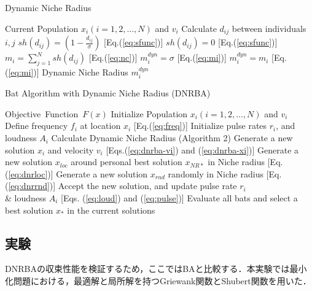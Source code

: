 \documentclass[a4j,11pt]{jarticle}
\begin{document}
\begin{algorithm}[h]
\caption{Dynamic Niche Radius}
\label{code:dnr}
\begin{algorithmic}[2]
\REQUIRE Current Population $x_i(i=1,2,..., N)$ and $v_i$
\STATE Calculate $d_{ij}$ between individuals $i,j$
\STATE $sh(d_{ij}) =  (1-\frac{d_{ij}}{\sigma})$ [Eq.(\ref{eq:sfunc})]
\ELSE
\STATE $sh(d_{ij}) =  0 $ [Eq.(\ref{eq:sfunc})]
\ENDIF
\ENDFOR
\STATE $m_i=\sum_{j=1}^N sh(d_{ij})$ [Eq.(\ref{eq:nc})]
\ENDFOR
{}
\STATE $m_i^{dyn}=\sigma$ [Eq.(\ref{eq:mi})]
\ELSE 
\STATE $m_i^{dyn} = m_i$ [Eq.(\ref{eq:mi})]
\ENDIF
\ENDFOR
\RETURN Dynamic Niche Radius $m_i^{dyn}$
\end{algorithmic}
\end{algorithm}

\begin{algorithm}[h]
\caption{Bat Algorithm with Dynamic Niche Radius (DNRBA)}
\label{code:dnrba}
\begin{algorithmic}[3]
\REQUIRE Objective\ Function\ $F(x)$
\STATE Initialize Population $x_i(i=1,2,..., N)$ and $v_i$\\
\STATE Define frequency $f_i$ at location $x_i$ [Eq.(\ref{eq:freq})]
\STATE Initialize pulse rates $r_i$, and loudness $A_i$
\STATE Calculate Dynamic Niche Radius (Algorithm 2)
\STATE Generate a new solution $x_i$ and velocity $v_i$ [Eqs.(\ref{eq:dnrba-vi}) and (\ref{eq:dnrba-xi})]
\ENDIF
{}
\STATE Generate a new solution $x_{loc}$ around personal best solution $x_{NR*}$ in Niche radius [Eq.(\ref{eq:dnrloc})] 
\ENDIF
\STATE Generate a new solution $x_{rnd}$ randomly in Niche radius [Eq.(\ref{eq:dnrrnd})]
\STATE Accept the new solution, and update pulse rate $r_i$ \\ \& loudness $A_i$ [Eqs. (\ref{eq:loud}) and (\ref{eq:pulse})]  
\ENDIF
\STATE Evaluate all bats and select a best solution $x_*$ in the current solutions
\ENDFOR
\ENDWHILE
\end{algorithmic}
\end{algorithm}

\subsection{実験}
\label{ss:DNRBA-exp}
DNRBAの収束性能を検証するため，ここではBAと比較する．本実験では最小化問題における，最適解と局所解を持つGriewank関数とShubert関数を用いた．
\end{document}
